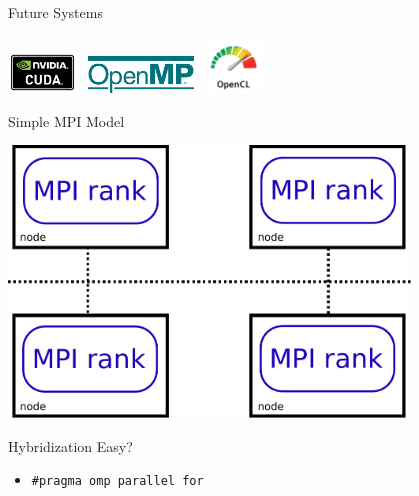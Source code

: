 \begin{frame}{Future Systems}
\begin{center}
 \includegraphics[height=1.1cm]{figures/cuda-logo} \
 \includegraphics[height=1cm]{figures/openmp_logo} \
 \includegraphics[height=1.5cm]{figures/opencl}
\end{center}


\end{frame}



\begin{frame}{Simple MPI Model}
\begin{center}
  \includegraphics[width=0.8\textwidth]{figures/simple-mpi}
\end{center}
\begin{block}{Hybridization Easy?}
 \begin{itemize}
   \item \texttt{\#pragma omp parallel for}
 \end{itemize}
\end{block}
\end{frame}



